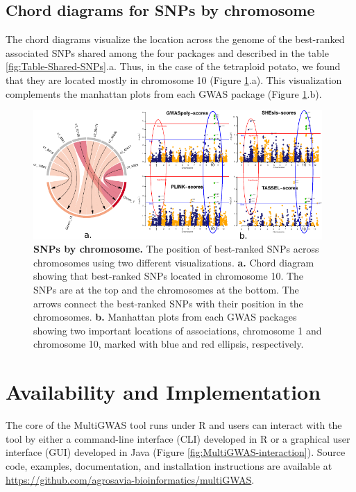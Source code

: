 \documentclass{article}
\begin{document}
\subsection{Chord diagrams for SNPs by chromosome}
The chord diagrams visualize the location across the genome of the best-ranked associated SNPs shared among the four packages and described in the table \ref{fig:Table-Shared-SNPs}.a.  Thus, in the case of the tetraploid potato, we found that they are located mostly in chromosome 10  (Figure \ref{fig:Chord-diagrams}.a). This visualization complements the manhattan plots from each GWAS package (Figure \ref{fig:Chord-diagrams}.b).


\begin{figure}
\begin{centering}
\includegraphics[width=11cm]{08_figure-chord-manhattans}
\par\end{centering}
\caption{\textbf{SNPs by chromosome.} The position of best-ranked SNPs across chromosomes using two different visualizations. \textbf{a.} Chord diagram showing that best-ranked SNPs located in chromosome 10. The SNPs are at the top and the chromosomes at the bottom. The arrows connect the best-ranked SNPs with their position in the chromosomes. \textbf{b.} Manhattan plots from each GWAS packages showing two important locations of associations, chromosome 1 and chromosome 10, marked with blue and red ellipsis, respectively. \label{fig:Chord-diagrams}}
\end{figure}

\section{Availability and Implementation}

The core of the MultiGWAS tool runs under R and users can interact with the tool by either a command-line interface (CLI) developed in
R or a graphical user interface (GUI) developed in Java (Figure \ref{fig:MultiGWAS-interaction}).
Source code, examples, documentation, and installation instructions are available at \url{https://github.com/agrosavia-bioinformatics/multiGWAS}. 
\end{document}
